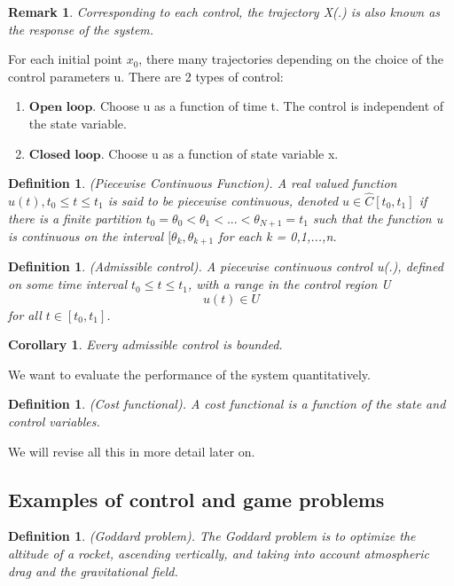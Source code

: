 \documentclass[twoside]{article}
\newtheorem{corollary}[theorem]{Corollary}
\newtheorem{remark}[theorem]{Remark}
\newtheorem{definition}[theorem]{Definition}
\begin{document}
\begin{remark}Corresponding to each control, the trajectory X(.) is also known as the response of the system.
\end{remark}

For each initial point $x_0$, there many trajectories depending on the choice of the control parameters u. There are 2 types of control:
\begin{enumerate}
\item $\textbf{Open loop}$. Choose u as a function of time t. The control is independent of the state variable.
\item $\textbf{Closed loop}$. Choose u as a function of state variable x.
\end{enumerate}

\begin{definition}(Piecewise Continuous Function). A real valued function $u(t), t_0 \leq t \leq t_1$ is said to be piecewise continuous, denoted $u \in \hat{C}[t_0,t_1]$ if there is a finite partition $t_0 = \theta_0 < \theta_1 < ... < \theta_{N+1} = t_1$ such that the function u is continuous on the interval $[\theta_k, \theta_{k+1}$ for each k = 0,1,...,n.
\end{definition}

\begin{definition}(Admissible control). A piecewise continuous control u(.), defined on some time interval $t_0 \leq t \leq t_1$, with a range in the control region U
$$
u(t) \in U
$$
for all $t \in [t_0, t_1]$.
\end{definition}

\begin{corollary}Every admissible control is bounded.
\end{corollary}

We want to evaluate the performance of the system quantitatively.

\begin{definition}(Cost functional). A cost functional is a function of the state and control variables.
\end{definition}

We will revise all this in more detail later on.

\subsection{Examples of control and game problems}

\begin{definition}(Goddard problem). The Goddard problem is to optimize the altitude of a rocket, ascending vertically, and taking into account atmospheric drag and the gravitational field.
\end{definition}
\end{document}
